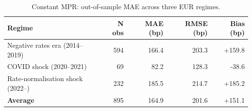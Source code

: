 \begin{table}[H]
\centering
\caption{Constant MPR: out-of-sample MAE across three EUR regimes.}
\label{tab:constant_mpr_regimes}
\small
\begin{tabular}{@{}lrrrr@{}}
\toprule
\textbf{Regime} & \textbf{N obs} & \textbf{MAE (bp)} & \textbf{RMSE (bp)} & \textbf{Bias (bp)} \\
\midrule
  Negative rates era (2014--2019) & 594 & 166.4 & 203.3 & +159.8 \\
  COVID shock (2020--2021) & 69 & 82.2 & 128.3 & -38.6 \\
  Rate-normalisation shock (2022--) & 232 & 185.5 & 214.7 & +185.2 \\
\midrule
  \textbf{Average} & 895 & 164.9 & 201.6 & +151.1 \\
\bottomrule
\end{tabular}
\end{table}